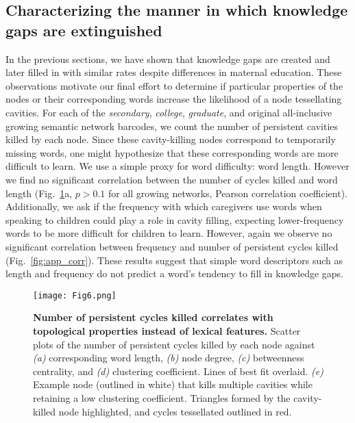 \documentclass{article}
\begin{document}
\subsection*{Characterizing the manner in which knowledge gaps are extinguished}

In the previous sections, we have shown that knowledge gaps are created and later filled in with similar rates despite differences in maternal education. These observations motivate our final effort to determine if particular properties of the nodes or their corresponding words increase the likelihood of a node tessellating cavities. For each of the \textit{secondary}, \textit{college}, \textit{graduate}, and original all-inclusive growing semantic network barcodes, we count the number of persistent cavities killed by each node. Since these cavity-killing nodes correspond to temporarily missing words, one might hypothesize that these corresponding words are more difficult to learn. We use a simple proxy for word difficulty: word length. However we find no significant correlation between the number of cycles killed and word length (Fig.~\ref{fig:6}a, $p>0.1$ for all growing networks, Pearson correlation coefficient). Additionally, we ask if the frequency with which caregivers use words when speaking to children could play a role in cavity filling, expecting lower-frequency words to be more difficult for children to learn. However, again we observe no significant correlation between frequency and number of persistent cycles killed (Fig.~\ref{fig:app_corr}). These results suggest that simple word descriptors such as length and frequency do not predict a word's tendency to fill in knowledge gaps.

\begin{figure}[h]
	\centering
	\texttt{[image: Fig6.png]}
	\caption{\textbf{Number of persistent cycles killed correlates with topological properties instead of lexical features.} Scatter plots of the number of persistent cycles killed by each node against \emph{(a)} corresponding word length, \emph{(b)} node degree, \emph{(c)} betweenness centrality, and \emph{(d)} clustering coefficient. Lines of best fit overlaid. \emph{(e)} Example node (outlined in white) that kills multiple cavities while retaining a low clustering coefficient. Triangles formed by the cavity-killed node highlighted, and cycles tessellated outlined in red.}
	\label{fig:6}
\end{figure}
\end{document}
